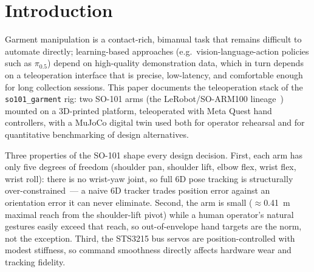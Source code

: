 \section{Introduction}
\label{sec:intro}

Garment manipulation is a contact-rich, bimanual task that remains difficult
to automate directly; learning-based approaches (e.g.\ vision-language-action
policies such as $\pi_{0.5}$) depend on high-quality demonstration data,
which in turn depends on a teleoperation interface that is precise,
low-latency, and comfortable enough for long collection sessions. This paper
documents the teleoperation stack of the \texttt{so101\_garment} rig: two
SO-101 arms (the LeRobot/SO-ARM100 lineage~\citep{soarm100}) mounted on a 3D-printed
platform, teleoperated with Meta Quest hand controllers, with a MuJoCo
digital twin used both for operator rehearsal and for quantitative
benchmarking of design alternatives.

Three properties of the SO-101 shape every design decision. First, each arm
has only five degrees of freedom (shoulder pan, shoulder lift, elbow flex,
wrist flex, wrist roll): there is no wrist-yaw joint, so full 6D pose
tracking is structurally over-constrained~--- a naive 6D tracker trades
position error against an orientation error it can never eliminate. Second,
the arm is small (\(\approx\)\SI{0.41}{m} maximal reach from the shoulder-lift
pivot) while a human operator's natural gestures easily exceed that reach, so
out-of-envelope hand targets are the norm, not the exception. Third, the
STS3215 bus servos are position-controlled with modest stiffness, so command
smoothness directly affects hardware wear and tracking fidelity.

